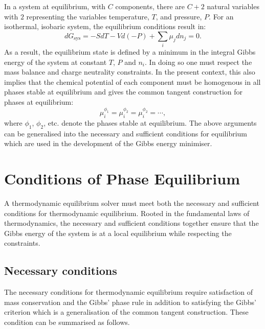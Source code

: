 	In a system at equilibrium, with $C$ components, there are $C+2$ natural variables with $2$ representing the variables temperature, $T$, and pressure, $P$. For an isothermal, isobaric system, the equilibrium conditions result in:
	\begin{equation}
		d G_{\text{sys}} = -S dT -Vd(-P) + \sum_{i} \mu_j d n_j = 0.
	\end{equation}
	As a result, the equilibrium state is defined by a minimum in the integral Gibbs energy of the system at constant $T$, $P$ and $n_i$. In doing so one must respect the mass balance and charge neutrality constraints. In the present context, this also implies that the chemical potential of each component must be homogenous in all phases stable at equilibrium and gives the common tangent construction for phases at equilibrium:
	\begin{equation}
		\mu_{i}^{\phi_1} = \mu_{i}^{\phi_2} = \mu_{i}^{\phi_2} = \cdots,
	\end{equation}
	where $\phi_1$, $\phi_2$, etc. denote the phases stable at equilibrium. The above arguments can be generalised into the necessary and sufficient conditions for equilibrium which are used in the development of the Gibbs energy minimiser. 

\section{Conditions of Phase Equilibrium} \label{sec:eqb_theory}
A thermodynamic equilibrium solver must meet both the necessary and sufficient conditions for thermodynamic equilibrium. Rooted in the fundamental laws of thermodynamics, the necessary and sufficient conditions together ensure that the Gibbs energy of the system is at a local equilibrium while respecting the constraints.

\subsection{Necessary conditions}
	The necessary conditions for thermodynamic equilibrium require satisfaction of mass conservation and the Gibbs' phase rule in addition to satisfying the Gibbs' criterion which is a generalisation of the common tangent construction. These condition can be summarised as follows.
	
